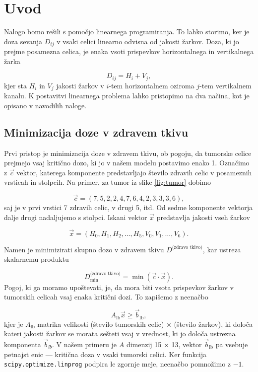\documentclass[slovene,11pt,a4paper]{article}
\begin{document}
\section{Uvod}

Nalogo bomo rešili s pomočjo linearnega programiranja. To lahko storimo, ker je doza sevanja $D_{ij}$ v vsaki celici linearno odvisna od jakosti žarkov. Doza, ki jo prejme posamezna celica, je enaka vsoti prispevkov horizontalnega in vertikalnega žarka

\begin{equation}
D_{ij} = H_i + V_j,
\end{equation}
kjer sta $H_i$ in $V_j$ jakosti žarkov v $i$-tem horizontalnem oziroma $j$-tem vertikalnem kanalu. K postavitvi linearnega problema lahko pristopimo na dva načina, kot je opisano v navodilih naloge.

\subsection{Minimizacija doze v zdravem tkivu}

Prvi pristop je minimizacija doze v zdravem tkivu, ob pogoju, da tumorske celice prejmejo vsaj kritično dozo, ki jo v našem modelu postavimo enako 1. Označimo z $\vec{c}$ vektor, katerega komponente predstavljajo število zdravih celic v posameznih vrsticah in stolpcih. Na primer, za tumor iz slike \ref{fig:tumor} dobimo

\[
\vec{c} = (7, 5, 2, 2, 4, 7, 6, 4, 2, 3, 3, 3, 6),
\]
saj je v prvi vrstici 7 zdravih celic, v drugi 5, itd. Od sedme komponente vektorja dalje drugi nadaljujemo s stolpci. Iskani vektor $\vec{x}$ predstavlja jakosti vseh žarkov

\[
\vec{x} = (H_0, H_1, H_2, \ldots, H_5, V_0, V_1, \ldots, V_6).
\]

Namen je minimizirati skupno dozo v zdravem tkivu $D^{\text{(zdravo tkivo)}}$, kar ustreza skalarnemu produktu

\begin{equation}
D_{\text{min}}^{\text{(zdravo tkivo)}} = \min(\vec{c} \cdot \vec{x}).
\end{equation}
Pogoj, ki ga moramo upoštevati, je, da mora biti vsota prispevkov žarkov v tumorskih celicah vsaj enaka kritični dozi. To zapišemo z neenačbo

\begin{equation}
A_{\text{lb}} \vec{x} \geq \vec{b}_{\text{lb}},
\end{equation}
kjer je $A_{\text{lb}}$ matrika velikosti (število tumorskih celic) × (število žarkov), ki določa kateri jakosti žarkov se morata sešteti vsaj v vrednost, ki jo določa ustrezna komponenta $\vec{b}_{lb}$. V našem primeru je $A$ dimenzij 15 × 13, vektor $\vec{b}_{\text{lb}}$ pa vsebuje petnajst enic — kritična doza v vsaki tumorski celici. Ker funkcija \texttt{scipy.optimize.linprog} podpira le zgornje meje, neenačbo pomnožimo z $-1$.
\end{document}
